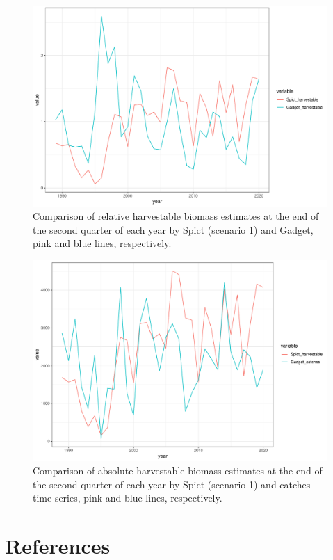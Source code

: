 \documentclass[review]{elsarticle}
\begin{document}
\begin{figure}[h!]
 \centering
 \includegraphics[]{./comparison.pdf}
 \caption{Comparison of relative harvestable biomass estimates at the end of the second quarter of each year by Spict (scenario 1) and Gadget, pink and blue lines, respectively.}
 \label{comp}
\end{figure}

\begin{figure}[h!]
 \centering
 \includegraphics[]{./comparison_abs_biospict_gadgetcatches.pdf}
 \caption{Comparison of absolute harvestable biomass estimates at the end of the second quarter of each year by Spict (scenario 1) and catches time series, pink and blue lines, respectively.}
 \label{spict_catches}
\end{figure}



\clearpage
\section{References}


\end{document}
